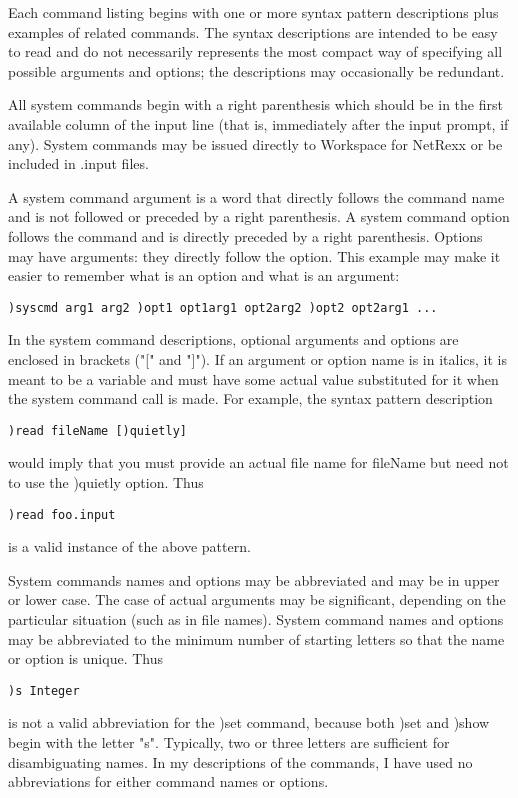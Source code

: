 Each command listing begins with one or more syntax pattern descriptions plus examples of related commands. The syntax descriptions are intended to be easy to read and do not necessarily represents the most compact way of specifying all possible arguments and options; the descriptions may occasionally be redundant.

All system commands begin with a right parenthesis which should be in the first available column of the input line (that is, immediately after the input prompt, if any). System commands may be issued directly to Workspace for NetRexx or be included in .input files.

A system command argument is a word that directly follows the command name and is not followed or preceded by a right parenthesis. A system command option follows the command and is directly preceded by a right parenthesis. Options may have arguments: they directly follow the option. This example may make it easier to remember what is an option and what is an argument:
\begin{verbatim}
)syscmd arg1 arg2 )opt1 opt1arg1 opt2arg2 )opt2 opt2arg1 ...
\end{verbatim}
In the system command descriptions, optional arguments and options are enclosed in brackets ("[" and "]"). If an argument or option name is in italics, it is meant to be a variable and must have some actual value substituted for it when the system command call is made. For example, the syntax pattern description
\begin{verbatim}
)read fileName [)quietly]
\end{verbatim}
would imply that you must provide an actual file name for fileName but need not to use the )quietly option. Thus

\begin{verbatim}
)read foo.input
\end{verbatim}
is a valid instance of the above pattern.

System commands names and options may be abbreviated and may be in upper or lower case. The case of actual arguments may be significant, depending on the particular situation (such as in file names). System command names and options may be abbreviated to the minimum number of starting letters so that the name or option is unique. Thus

\begin{verbatim}
)s Integer
\end{verbatim}
is not a valid abbreviation for the )set command, because both )set and )show begin with the letter "s". Typically, two or three letters are sufficient for disambiguating names. In my descriptions of the commands, I have used no abbreviations for either command names or options.

